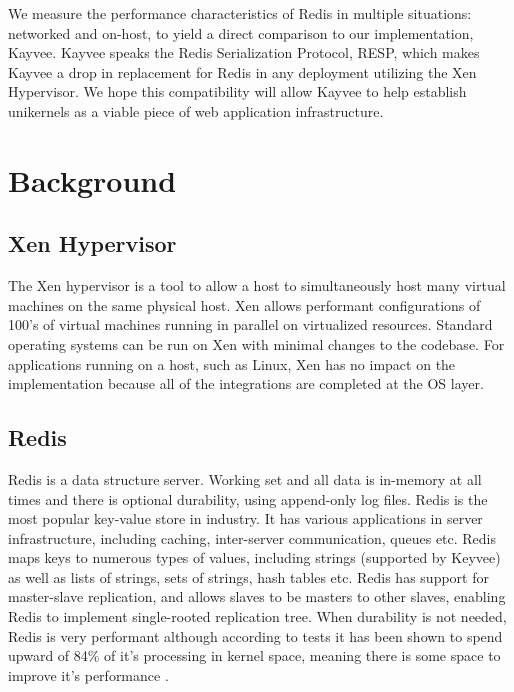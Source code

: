 \documentclass[english,10pt,twocolumn]{article}
\begin{document}
We measure the performance characteristics of Redis in multiple situations: networked and on-host, to yield a direct comparison to our implementation, Kayvee.
Kayvee speaks the Redis Serialization Protocol\cite{redis-protocol}, RESP, which makes Kayvee a drop in replacement for Redis in any deployment utilizing the Xen Hypervisor.
We hope this compatibility will allow Kayvee to help establish unikernels as a viable piece of web application infrastructure.


\section{Background}



\subsection{Xen Hypervisor}

The Xen hypervisor is a tool to allow a host to simultaneously host many virtual machines on the same physical host.
Xen allows performant configurations of 100's of virtual machines running in parallel on virtualized resources.
Standard operating systems can be run on Xen with minimal changes to the codebase.
For applications running on a host, such as Linux, Xen has no impact on the implementation because all of the integrations are completed at the OS layer.


\subsection{Redis}

Redis is a data structure server.
Working set and all data is in-memory at all times and there is optional durability, using append-only log files.
Redis is the most popular key-value store in industry\cite{dbengines}.
It has various applications in server infrastructure, including caching, inter-server communication, queues etc.
Redis maps keys to numerous types of values, including strings (supported by Keyvee) as well as lists of strings, sets of strings, hash tables etc.
Redis has support for master-slave replication, and allows slaves to be masters to other slaves, enabling Redis to implement single-rooted replication tree.
When durability is not needed, Redis is very performant although according to tests it has been shown to spend upward of 84\% of it's processing in kernel space, meaning there is some space to improve it's performance \cite{latency}.
\end{document}
